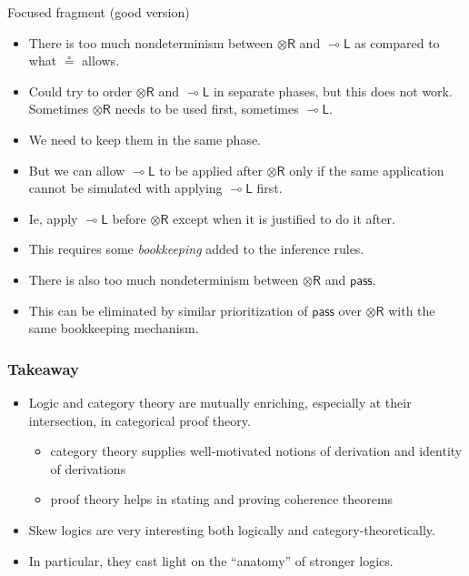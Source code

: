 \documentclass[10pt,t]{beamer}
\newcommand{\ot}{\otimes}
\newcommand{\uf}{\mathsf{pass}}
\newcommand{\otR}{\ot\mathsf{R}}
\newcommand{\loL}{{\lo}\mathsf{L}}
\newcommand{\lo}{\multimap}
\begin{document}
\begin{frame}{Focused fragment (good version)}

\begin{itemize}

\item There is too much nondeterminism between $\otR$ and $\loL$ as
  compared to what $\circeq$ allows.

\bigskip

\item Could try to order $\otR$ and $\loL$ in separate phases,
  but this does not work. Sometimes $\otR$ needs to be used first,
  sometimes $\loL$.

\bigskip

\item We need to keep them in the same phase.

\item But we can allow $\loL$ to be applied after $\otR$ only if the
  same application cannot be simulated with applying $\loL$ first.

\item Ie, apply $\loL$ before $\otR$ except when it is justified to do
  it after.

\item This requires some \emph{bookkeeping} added to the inference
  rules.

\bigskip 

\item There is also too much nondeterminism between $\otR$ and $\uf$.

\item This can be eliminated by similar prioritization of $\uf$ over
  $\otR$ with the same bookkeeping mechanism.

\end{itemize}


\end{frame}


\begin{frame}

\frametitle{Takeaway}

\begin{itemize}

\item Logic and category theory are mutually enriching, especially
  at their intersection, in categorical proof theory.

\begin{itemize}
\item category theory supplies well-motivated notions of derivation
  and identity of derivations
\item proof theory helps in stating and proving coherence theorems
\end{itemize}

\bigskip

\item Skew logics are very interesting both logically
  and category-theoretically. 

\item In particular, they cast light on the ``anatomy'' of stronger
  logics.

\end{itemize}

\end{frame}
\end{document}
